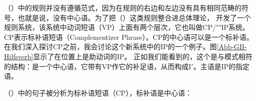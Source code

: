 （）中的规则并没有遵循\xbarc 范式，因为在规则的右边和左边没有具有相同范畴的符号，也就是说，没有中心语。为了把（）这类规则整合进总体理论， \citet[]{Chomsky86b}开发了一个规则系统，该系统中动词短语（VP）上面有两个层次，它也叫做CP/""IP系统。CP表示标补语短语（Complementizer Phrase）。CP的中心语可以是一个标补语。在我们深入探讨CP之前，我会讨论这个新系统中的IP的一个例子。图\ref{Abb-GB-Hilfsverb}显示了在\inullc 位置上是助动词的IP。
正如我们能看到的，这个是与\xbarc 模式相符的结构：\inullc 是一个中心语，它带有VP作它的补足语，从而构成I$'$。主语是IP的指定语。
%

（）中的句子被分析为标补语短语（CP），标补语是中心语：

